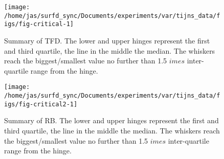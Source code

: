 \begin{knitrout}
\color{fgcolor}\begin{figure}
\texttt{[image: /home/jas/surfd\_sync/Documents/experiments/var/tijns\_data/figs/fig-critical-1]} \caption{\label{fig:visual-summary-crit-tfd}Summary of TFD. The lower and upper hinges represent the first and third quartile, the line in the middle the median. The whiskers reach the biggest/smallest value no further than 1.5 $	imes$ inter-quartile range from the hinge.}\label{fig:fig-critical}
\end{figure}

\end{knitrout}

\begin{knitrout}
\color{fgcolor}\begin{figure}
\texttt{[image: /home/jas/surfd\_sync/Documents/experiments/var/tijns\_data/figs/fig-critical2-1]} \caption{\label{fig:visual-summary-crit-rb}Summary of RB. The lower and upper hinges represent the first and third quartile, the line in the middle the median. The whiskers reach the biggest/smallest value no further than 1.5 $	imes$ inter-quartile range from the hinge.}\label{fig:fig-critical2}
\end{figure}

\end{knitrout}

